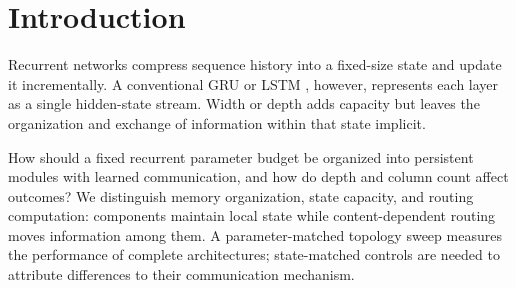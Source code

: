 \documentclass[letterpaper,twoside]{article}
\begin{document}

\begin{abstract}
Recurrent models preserve a fixed-size state, conventionally organized as one stream per layer. MoSAIC (Modular Self-Attentive Interacting Columns) distributes this state across persistent GRU columns that exchange messages through attention. We evaluate the resulting architectures on Store--Distract--Query (SDQ) and text8 with a one-billion-token training budget. At approximately ten million parameters, a two-layer, four-column grid (L2C4) obtains $0.8433\pm0.0055$ SDQ Acc++ versus $0.6177\pm0.0052$ for the strongest GRU. Acc++ is an online retrieval diagnostic under the final curriculum. On text8, L2C4 and the three-layer, four-column grid (L3C4) obtain $1.4397\pm0.0050$ and $1.4345\pm0.0017$ validation bits per character, versus $1.4830\pm0.0061$ for the strongest GRU. Their observed means are lower than a finite-context Transformer's $1.4492\pm0.0120$, although this difference is unresolved with three runs. Two- and three-layer grids also have lower observed means at the one-million-parameter scale; their differences from the strongest GRU remain unresolved. These results characterize a task-dependent architectural tradeoff; routing and the larger carried state remain coupled.
\end{abstract}

\section{Introduction}

Recurrent networks compress sequence history into a fixed-size state and update it incrementally. A conventional GRU \citep{cho2014gru} or LSTM \citep{hochreiter1997lstm}, however, represents each layer as a single hidden-state stream. Width or depth adds capacity but leaves the organization and exchange of information within that state implicit.

How should a fixed recurrent parameter budget be organized into persistent modules with learned communication, and how do depth and column count affect outcomes? We distinguish memory organization, state capacity, and routing computation: components maintain local state while content-dependent routing moves information among them. A parameter-matched topology sweep measures the performance of complete architectures; state-matched controls are needed to attribute differences to their communication mechanism.
\end{document}
